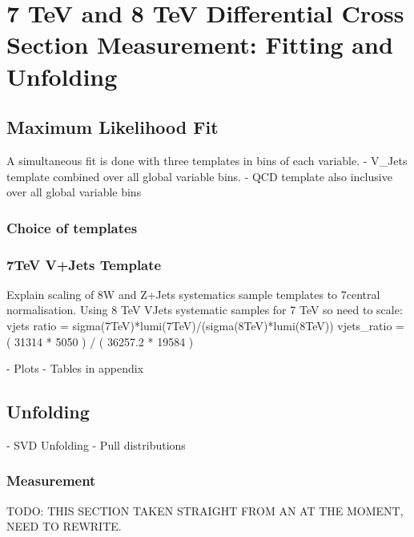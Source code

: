 \chapter{7 TeV and 8 TeV Differential Cross Section Measurement: Fitting and Unfolding}
\label{c:Differential_Cross_Section:fitting_and_unfolding}

\section{Maximum Likelihood Fit}
\label{maximum_likelihood_fit}
A simultaneous fit is done with three templates in bins of each variable.
- V\_Jets template combined over all global variable bins.
- QCD template also inclusive over all global variable bins

\subsection{Choice of templates}
\label{choice_of_templates}

\subsection{7TeV V+Jets Template}
\label{ss:7TeV_vplusjets_template}
Explain scaling of 8\TeV W and Z+Jets systematics sample templates to 7\TeV central normalisation.
    Using 8 TeV VJets systematic samples for 7 TeV so need to scale:
    vjets ratio = sigma(7TeV)*lumi(7TeV)/(sigma(8TeV)*lumi(8TeV))
    vjets\_ratio = ( 31314 * 5050 ) / ( 36257.2 * 19584 )

\label{ss:fit_results}
- Plots
- Tables in appendix

\section{Unfolding}
\label{ss:unfolding}
		- SVD Unfolding
		- Pull distributions

\subsection{Measurement}
\label{ss:measurement}
TODO: THIS SECTION TAKEN STRAIGHT FROM AN AT THE MOMENT, NEED TO REWRITE.

